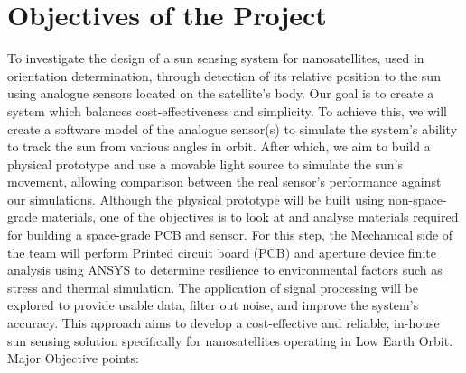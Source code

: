 \section{Objectives of the Project}
To investigate the design of a sun sensing system for nanosatellites, used in orientation determination, through detection of its relative position to the sun using analogue sensors located on the satellite's body. Our goal is to create a system which balances cost-effectiveness and simplicity.
To achieve this, we will create a software model of the analogue sensor(s) to simulate the system's ability to track the sun from various angles in orbit. After which, we aim to build a physical prototype and use a movable light source to simulate the sun's movement, allowing comparison between the real sensor's performance against our simulations.
Although the physical prototype will be built using non-space-grade materials, one of the objectives is to look at and analyse materials required for building a space-grade PCB and sensor. For this step, the Mechanical side of the team will perform Printed circuit board (PCB) and aperture device finite analysis using ANSYS to determine resilience to environmental factors such as stress and thermal simulation.
The application of signal processing will be explored to provide usable data, filter out noise, and improve the system's accuracy.
This approach aims to develop a cost-effective and reliable, in-house sun sensing solution specifically for nanosatellites operating in Low Earth Orbit.
Major Objective points:
